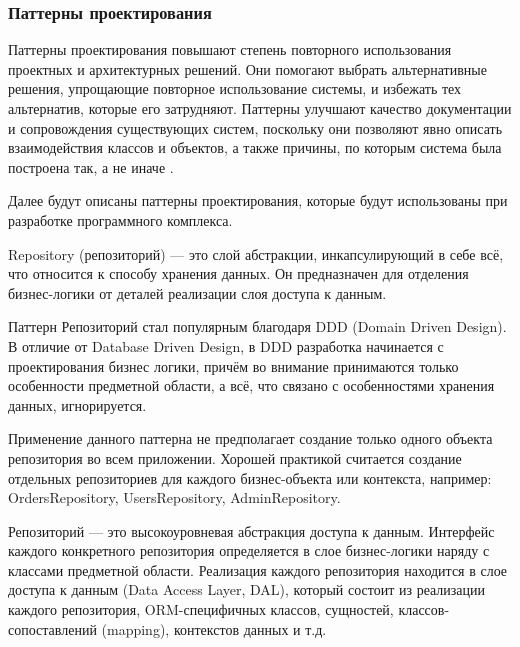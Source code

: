 \subsubsection{Паттерны проектирования}

Паттерны проектирования повышают степень повторного использования проектных и архитектурных решений. Они помогают выбрать альтернативные решения, упрощающие повторное использование системы, и избежать тех альтернатив, которые его затрудняют. Паттерны улучшают качество документации и сопровождения существующих систем, поскольку они позволяют явно описать взаимодействия классов и объектов, а также причины, по которым система была построена так, а не иначе \cite{patterns}.

Далее будут описаны паттерны проектирования, которые будут использованы при разработке программного комплекса.



Repository (репозиторий) \cite{repository_pattern} --- это слой абстракции, инкапсулирующий в себе всё, что относится к способу хранения данных. Он предназначен для отделения бизнес-логики от деталей реализации слоя доступа к данным.

Паттерн Репозиторий стал популярным благодаря DDD (Domain Driven Design). В отличие от Database Driven Design, в DDD разработка начинается с проектирования бизнес логики, причём во внимание принимаются только особенности предметной области, а всё, что связано с особенностями хранения данных, игнорируется.

Применение данного паттерна не предполагает создание только одного объекта репозитория во всем приложении. Хорошей практикой считается создание отдельных репозиториев для каждого бизнес-объекта или контекста, например: OrdersRepository, UsersRepository, AdminRepository.

Репозиторий --- это высокоуровневая абстракция доступа к данным. Интерфейс каждого конкретного репозитория определяется в слое бизнес-логики наряду с классами предметной области. Реализация каждого репозитория находится в слое доступа к данным (Data Access Layer, DAL), который состоит из реализации каждого репозитория, ORM-специфичных классов, сущностей, классов-сопоставлений (mapping), контекстов данных и т.д.



